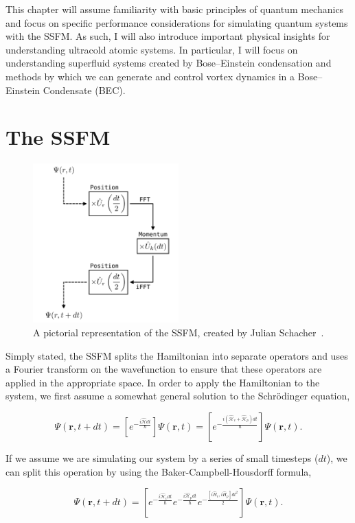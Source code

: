 This chapter will assume familiarity with basic principles of quantum mechanics and focus on specific performance considerations for simulating quantum systems with the SSFM.
As such, I will also introduce important physical insights for understanding ultracold atomic systems.
In particular, I will focus on understanding superfluid systems created by Bose--Einstein condensation and methods by which we can generate and control vortex dynamics in a Bose--Einstein Condensate (BEC).

\section{The SSFM}
\begin{figure}
\center \includegraphics[width=0.5\textwidth]{data/splitop/method/split_op_method.pdf}

\caption{A pictorial representation of the SSFM, created by Julian Schacher~\cite{AAA}.}
\label{fig:method}
\end{figure}

Simply stated, the SSFM splits the Hamiltonian into separate operators and uses a Fourier transform on the wavefunction to ensure that these operators are applied in the appropriate space.
In order to apply the Hamiltonian to the system, we first assume a somewhat general solution to the Schr\"odinger equation,

$$
\Psi(\mathbf{r},t + dt) = \left[e^{-\frac{i\mathcal{\hat{H}}dt}{\hbar}}\right]\Psi(\mathbf{r},t) = \left[e^{-\frac{i(\mathcal{\hat{H}}_v + \mathcal{\hat{H}}_p)dt}{\hbar}}\right]\Psi(\mathbf{r},t).
$$

\noindent If we assume we are simulating our system by a series of small timesteps ($dt$), we can split this operation by using the Baker-Campbell-Housdorff formula,

$$
\Psi(\mathbf{r},t+dt) = \left[e^{-\frac{i\mathcal{\hat{H}}_vdt}{\hbar}}e^{-\frac{i\mathcal{\hat{H}}_pdt}{\hbar}}e^{-\frac{[i\hat{H}_v, i\hat{H}_p]dt^2}{2}}\right]\Psi(\mathbf{r},t).
$$

